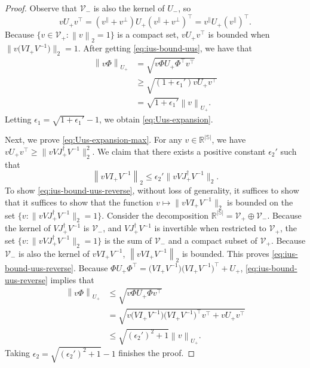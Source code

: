 \documentclass[11pt,letterpaper]{article}
\theoremstyle{plain}
\theoremstyle{definition}
\theoremstyle{remark}
\newcommand{\norm}[1]{\left\lVert#1\right\rVert}
\newcommand{\normplain}[1]{\lVert#1\rVert}
\newcommand{\normbig}[1]{\big\lVert#1\big\rVert}
\newcommand{\R}{\mathbb{R}}
\newcommand{\sspa}{\mathbb{S}}
\newcommand{\gapus}{\epsilon_1} %
\newcommand{\gapusmax}{\epsilon_2}
\newcommand{\subus}{+}%
\newcommand{\subst}{-}%
\newcommand{\Jus}{J_{\subus}}
\newcommand{\Ius}{I_{\subus}}
\newcommand{\Uus}{U_{\subus}}
\newcommand{\Ust}{U_{\subst}}
\newcommand{\spus}{\mathcal{V}_{\subus}}
\newcommand{\spst}{\mathcal{V}_{\subst}}
\begin{document}
\begin{proof}
    Observe that $\spst$ is also the kernel of $\Ust$, so 
    \[
        v \Uus v^\top =  (v^\parallel + v^\perp) \Uus (v^\parallel+v^\perp)^\top = v^\parallel \Uus (v^\parallel)^\top.
    \]
    Because $\{v\in\spus \colon \norm{v}_2 = 1\}$ is a compact set, $v \Uus v^\top$ is bounded when $\normplain{v\big(V \Ius V^{-1}\big)}_2 = 1$. 
    After getting \eqref{eq:ius-bound-uus}, we have that 
    \begin{align*}
        \norm{v \Phi}_{\Uus}
        &= \sqrt{v \Phi \Uus \Phi^\top v^\top} \\
        &\geq \sqrt{(1 + \gapus') v \Uus v^\top} \\
        &= \sqrt{1+\gapus'} \norm{v}_{\Uus}.
    \end{align*}
    Letting $\gapus = \sqrt{1+\gapus'} - 1$, we obtain \eqref{eq:Uus-expansion}. 

    Next, we prove \eqref{eq:Uus-expansion-max}. 
    For any $v\in \R^{|\sspa|}$, we have $v \Uus v^\top \geq \normbig{v V \Jus^\dagger V^{-1}}_2^2$. 
    We claim that there exists a positive constant $\gapusmax'$ such that
    \begin{equation}
         \label{eq:ius-bound-uus-reverse}
        \norm{v V \Ius V^{-1}}_2 \leq \gapusmax' \normbig{v V \Jus^\dagger V^{-1}}_2.
    \end{equation}
    To show \eqref{eq:ius-bound-uus-reverse}, 
    without loss of generality, it suffices to show that 
    it suffices to show that the function $v\mapsto \normplain{v V \Ius V^{-1}}_2$ is bounded on the set $\{v\colon \normplain{v V \Jus^\dagger V^{-1}}_2 = 1\}$. 
    Consider the decomposition $\R^{|\sspa|} = \spus \oplus \spst$. 
    Because the kernel of $V \Jus^\dagger V^{-1}$ is $\spst$, and $V \Jus^\dagger V^{-1}$ is invertible when restricted to $\spus$, the set $\{v\colon \normplain{v V \Jus^\dagger V^{-1}}_2 = 1\}$ is the sum of $\spst$ and a compact subset of $\spus$. Because $\spst$ is also the kernel of $v V \Ius V^{-1}$, $\norm{v V \Ius V^{-1}}_2$ is bounded. This proves \eqref{eq:ius-bound-uus-reverse}. Because $\Phi \Uus \Phi^\top = \big(V \Ius V^{-1}\big)\big(V \Ius V^{-1}\big)^\top + \Uus$, \eqref{eq:ius-bound-uus-reverse} implies that 
    \begin{align*}
        \norm{v \Phi}_{\Uus}
        &\leq \sqrt{v\Phi \Uus \Phi v^\top} \\
        &= \sqrt{v\big(V \Ius V^{-1}\big)\big(V \Ius V^{-1}\big)^\top v^\top + v\Uus v^\top} \\
        &\leq \sqrt{(\gapusmax')^2 +1 } \norm{v}_{\Uus}.
    \end{align*}
    Taking $\gapusmax = \sqrt{(\gapusmax')^2 +1 } - 1$ finishes the proof. 


\end{proof}
\end{document}

